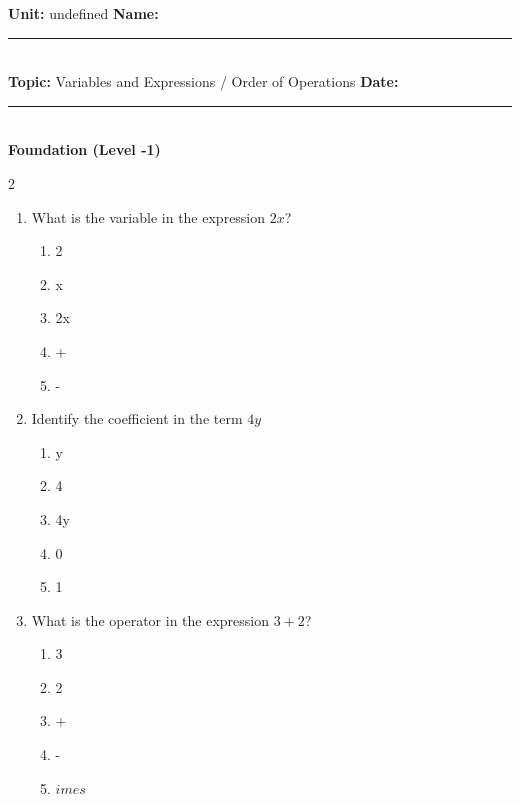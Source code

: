 \documentclass[10pt]{article}
\begin{document}
\enlargethispage{2.5cm}

\begin{tcolorbox}[colback=mainblue!5, colframe=mainblue, sharp corners, boxrule=0.5pt]
    \small \textbf{Unit:} undefined \hfill \textbf{Name:} \rule{3cm}{0.4pt} \\
    \small \textbf{Topic:} Variables and Expressions / Order of Operations \hfill \textbf{Date:} \rule{2cm}{0.4pt} \\
    \centering \textbf{\large Foundation (Level -1)}
\end{tcolorbox}

\vspace{0.2cm}

\begin{multicols}{2}
\begin{enumerate}[label=\textbf{Q\arabic*.}, leftmargin=*, itemsep=6pt, parsep=0pt]

  \item \small What is the variable in the expression $2x$?
  \begin{enumerate}[label=(\Alph*), leftmargin=0.6cm, nosep, itemsep=2pt]
    \item 2
    \item x
    \item 2x
    \item +
    \item -
  \end{enumerate}

  \item \small Identify the coefficient in the term $4y$
  \begin{enumerate}[label=(\Alph*), leftmargin=0.6cm, nosep, itemsep=2pt]
    \item y
    \item 4
    \item 4y
    \item 0
    \item 1
  \end{enumerate}

  \item \small What is the operator in the expression $3 + 2$?
  \begin{enumerate}[label=(\Alph*), leftmargin=0.6cm, nosep, itemsep=2pt]
    \item 3
    \item 2
    \item +
    \item -
    \item $	imes$
  \end{enumerate}


\end{enumerate}
\end{multicols}
\end{document}
